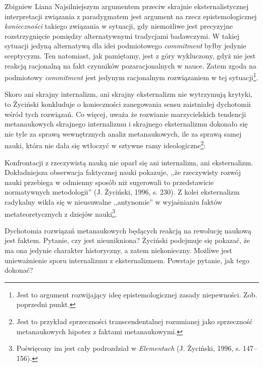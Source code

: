 \begin{artplenv}{Zbigniew Liana}
Najsilniejszym argumentem przeciw skrajnie eksternalistycznej interpretacji związania z paradygmatem jest argument na
rzecz epistemologicznej \textit{konieczności} takiego związania w sytuacji, gdy niemożliwe jest precyzyjne
rozstrzygnięcie pomiędzy alternatywnymi tradycjami badawczymi. W takiej sytuacji jedyną alternatywą dla idei
podmiotowego \textit{commitment} byłby jedynie sceptycyzm. Ten natomiast, jak pamiętamy, jest z góry wykluczony, gdyż nie
jest reakcją racjonalną na fakt czynników pozaracjonalnych w nauce. Zatem zgoda na podmiotowy \textit{commitment} jest
jedynym racjonalnym rozwiązaniem w tej sytuacji\footnote{Jest to argument rozwijający ideę epistemologicznej zasady
	niepewności. Zob. poprzedni punkt. }.

Skoro ani skrajny internalizm, ani skrajny eksternalizm nie wytrzymują krytyki, to Życiński konkluduje o konieczności
zanegowania sensu zaistniałej dychotomii wśród tych rozwiązań. Co więcej, uważa że rozwianie marzycielskich tendencji
metanaukowych skrajnego internalizmu i skrajnego eksternalizmu dokonało się nie tyle za sprawą wewnętrznych analiz
metanaukowych, ile za sprawą samej nauki, która nie dała się wtłoczyć w sztywne ramy ideologiczne\footnote{Jest to
	przykład sprzeczności transcendentalnej rozumianej jako sprzeczność metanaukowych hipotez z faktami metanaukowymi.}:


Konfrontacji z rzeczywistą nauką nie oparł się ani internalizm, ani eksternalizm. Dokładniejsza obserwacja faktycznej
nauki pokazuje, ,,że rzeczywisty rozwój nauki przebiega w odmienny sposób niż sugerowali to przedstawicie normatywnych
metodologii'' \label{ref:RNDWCF6lU0sbi}(J. Życiński, 1996, s. 230). Z kolei eksternalizm radykalny wikła się w
nieusuwalne ,,antynomie'' w wyjaśnianiu faktów metateoretycznych z dziejów nauki\footnote{Poświęcony im jest cały
	podrozdział w \textit{Elementach} \label{ref:RNDrpsugHpH8D}(J. Życiński, 1996, s. 147–156).}.

Dychotomia rozwiązań metanaukowych będących reakcją na rewolucję naukową jest faktem. Pytanie, czy jest nieunikniona?
Życiński podejmuje się pokazać, że ma ona jedynie charakter historyczny, a zatem niekonieczny. Możliwe jest
unieważnienie sporu internalizmu z eksternalizmem. Powstaje pytanie, jak tego dokonać?


\end{artplenv}
